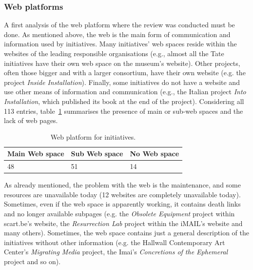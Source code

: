 \subsubsection{Web platforms}
A first analysis of the web platform where the review was conducted must be done. As mentioned above, the web is the main form of communication and information used by initiatives. Many initiatives’ web spaces reside within the websites of the leading responsible organisations (e.g., almost all the Tate initiatives have their own web space on the museum's website). Other projects, often those bigger and with a larger consortium, have their own website (e.g. the project \textit{Inside Installation}). Finally, some initiatives do not have a website and use other means of information and communication (e.g., the Italian project \textit{Into Installation}, which published its book at the end of the project). Considering all 113 entries, table~\ref{tab:web_plaforma_for_initiatives} summarises the presence of main or sub-web spaces and the lack of web pages.

\begin{table}[!h]
\centering
\begin{adjustbox}{max width=\textwidth}
\begin{tabular}{|l|l|l|} \hline
Main Web space & Sub Web space & No Web space \\\hline
48             & 51            & 14           \\\hline
\end{tabular}
\end{adjustbox}
\caption{\label{tab:web_plaforma_for_initiatives}Web platform for initiatives.}
\end{table}

As already mentioned, the problem with the web is the maintenance, and some resources are unavailable today (12 websites are completely unavailable today). Sometimes, even if the web space is apparently working, it contains death links and no longer available subpages (e.g. the\textit{ Obsolete Equipment} project within scart.be’s website, the \textit{Resurrection Lab} project within the iMAIL’s website and many others). Sometimes, the web space contains just a general description of the initiatives without other information (e.g. the Hallwall Contemporary Art Center’s \textit{Migrating Media} project, the Imai’s \textit{Concretions of the Ephemeral} project and so on).

